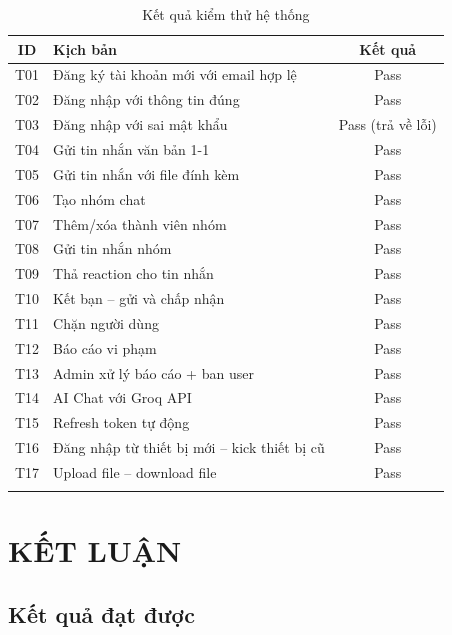 \documentclass[12pt,a4paper]{report}
\begin{document}
\begin{longtable}{|c|p{9cm}|c|}
    \hline
    \textbf{ID} & \textbf{Kịch bản} & \textbf{Kết quả} \\
    \hline
    T01 & Đăng ký tài khoản mới với email hợp lệ & Pass \\
    \hline
    T02 & Đăng nhập với thông tin đúng & Pass \\
    \hline
    T03 & Đăng nhập với sai mật khẩu & Pass (trả về lỗi) \\
    \hline
    T04 & Gửi tin nhắn văn bản 1-1 & Pass \\
    \hline
    T05 & Gửi tin nhắn với file đính kèm & Pass \\
    \hline
    T06 & Tạo nhóm chat & Pass \\
    \hline
    T07 & Thêm/xóa thành viên nhóm & Pass \\
    \hline
    T08 & Gửi tin nhắn nhóm & Pass \\
    \hline
    T09 & Thả reaction cho tin nhắn & Pass \\
    \hline
    T10 & Kết bạn -- gửi và chấp nhận & Pass \\
    \hline
    T11 & Chặn người dùng & Pass \\
    \hline
    T12 & Báo cáo vi phạm & Pass \\
    \hline
    T13 & Admin xử lý báo cáo + ban user & Pass \\
    \hline
    T14 & AI Chat với Groq API & Pass \\
    \hline
    T15 & Refresh token tự động & Pass \\
    \hline
    T16 & Đăng nhập từ thiết bị mới -- kick thiết bị cũ & Pass \\
    \hline
    T17 & Upload file -- download file & Pass \\
    \hline
    \caption{Kết quả kiểm thử hệ thống}
\end{longtable}

\chapter{KẾT LUẬN}

\section{Kết quả đạt được}
\end{document}

